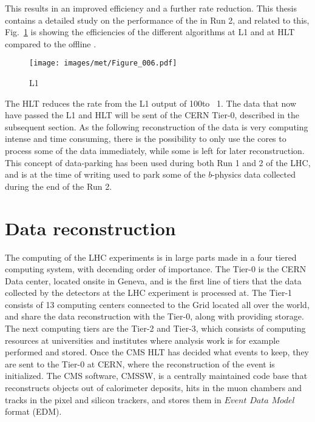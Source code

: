 This results in an improved efficiency and a further rate reduction. 
This thesis contains a detailed study on the performance of the \ptmiss in Run 2, and related to this, Fig.~\ref{fig:triggerMET} is showing the efficiencies of the different \ptmiss algorithms at L1 and at HLT compared to the offline \ptmiss.   
\begin{figure}[!htp]
  \centering
   \texttt{[image: images/met/Figure\_006.pdf]}
   \caption{L1}
   \label{fig:triggerMET}
\end{figure}                                                                         
The HLT reduces the rate from the L1 output of 100\kHz to ~1\kHz. The data that now have passed the L1 and HLT will be sent of the CERN Tier-0, described in the subsequent section. 
As the following reconstruction of the data is very computing intense and time consuming, there is the possibility to only use the cores to process some of the data immediately, while some is left for later reconstruction. 
This concept of data-parking has been used during both Run 1 and 2 of the LHC, and is at the time of writing used to park some of the $b$-physics data collected during the end of the Run 2. 
\section{Data reconstruction}
The computing of the LHC experiments is in large parts made in a four tiered computing system, with decending order of importance. 
The Tier-0 is the CERN Data center, located onsite in Geneva, and is the first line of tiers that the data collected by the detectors at the LHC experiment is processed at. 
The Tier-1 consists of 13 computing centers connected to the Grid located all over the world, and share the data reconstruction with the Tier-0, along with providing storage.
The next computing tiers are the Tier-2 and Tier-3, which consists of computing resources at universities and institutes where analysis work is for example performed and stored. 
Once the CMS HLT has decided what events to keep, they are sent to the Tier-0 at CERN, where the reconstruction of the event is initialized. 
The CMS software, CMSSW, is a centrally maintained code base that reconstructs objects out of calorimeter deposits, hits in the muon chambers and tracks in the pixel and silicon trackers, and stores them in $Event$ $Data$ $Model$ format (EDM).    

